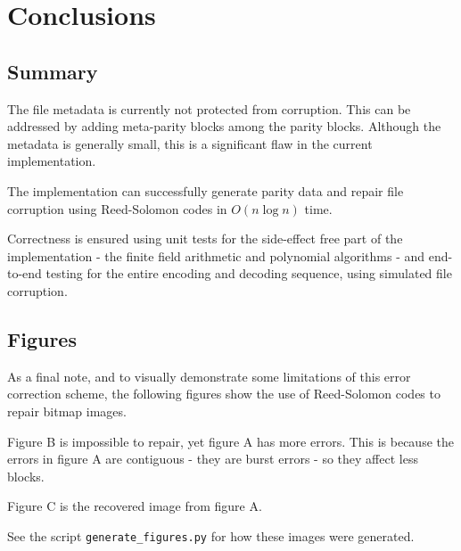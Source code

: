 \chapter{Conclusions}

\section{Summary}

The file metadata is currently not protected from corruption.
This can be addressed by adding meta-parity blocks among the parity blocks.
Although the metadata is generally small, this is a significant flaw in the current implementation.

The implementation can successfully generate parity data and repair file corruption using Reed-Solomon codes in $O(n \log n)$ time.

Correctness is ensured using unit tests for the side-effect free part of the implementation - the finite field arithmetic and polynomial algorithms - and end-to-end testing for the entire encoding and decoding sequence, using simulated file corruption.

\pagebreak

\section{Figures}


As a final note, and to visually demonstrate some limitations of this error correction scheme,
the following figures show the use of Reed-Solomon codes to repair bitmap images.

Figure B is impossible to repair, yet figure A has more errors.
This is because the errors in figure A are contiguous - they are burst errors - so they affect less blocks.

Figure C is the recovered image from figure A.

See the script \texttt{generate\_figures.py} for how these images were generated.

